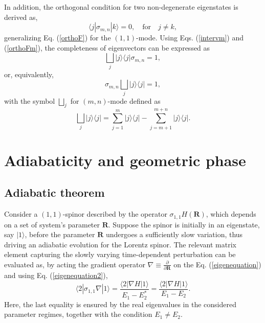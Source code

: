 \documentclass[pra,epsfig,rotate,superscriptaddress,showpacs]{revtex4}
\begin{document}
In addition, the orthogonal condition for two non-degenerate eigenstates is derived as,
\begin{equation}\label{orthoFm}
\langle j|\sigma_{m,n}|k\rangle=0, \quad {\text{for}} \quad j\neq k,
\end{equation}
generalizing Eq. (\ref{orthoF}) for the $(1,1)$-mode. Using Eqs.  (\ref{intervm}) and (\ref{orthoFm}), the completeness of eigenvectors can be expressed as
\begin{equation} \label{completeness3}
\bigsqcup_{j} |j\rangle\langle j| \sigma_{m,n}=1,
\end{equation}
or, equivalently,
\begin{equation} \label{completeness4}
\sigma_{m,n} \bigsqcup_{j}  |j\rangle\langle j|=1,
\end{equation}
with the symbol $\bigsqcup_j$ for $(m,n)$-mode defined as
\begin{equation}
 \bigsqcup_{j}  |j\rangle\langle j|=\sum_{j=1}^m|j\rangle\langle j|-\sum_{j=m+1}^{m+n}|j\rangle\langle j|.
\end{equation}


\section{Adiabaticity and geometric phase}
\label{berry}

\subsection{Adiabatic theorem}

Consider a $(1,1)$-spinor described by the operator $\sigma_{1,1}H(\mathbf{R})$, which depends on a set of system's parameter $\mathbf{R}$. Suppose the spinor is initially in an eigenstate, say $|1\rangle$, before the parameter $\mathbf{R}$ undergoes a sufficiently slow variation, thus driving an adiabatic evolution for the Lorentz spinor.  The relevant matrix element capturing the slowly varying time-dependent perturbation can be evaluated as, by acting the gradient operator $\nabla\equiv\frac{\partial}{\partial \mathbf{R}}$ on the Eq. (\ref{eigenequation}) and using Eq. (\ref{eigenequation2}),
\begin{equation} \label{for-Berry-adia}
\langle 2|\sigma_{1,1} \nabla|1\rangle=\frac{\langle 2|\nabla H|1\rangle}{E_1-E_2^*}=\frac{\langle 2|\nabla H|1\rangle}{E_1-E_2}.
\end{equation}
Here, the last equality is ensured by the real eigenvalues in the considered parameter regimes, together with the condition $E_1\neq E_2$.
\end{document}
